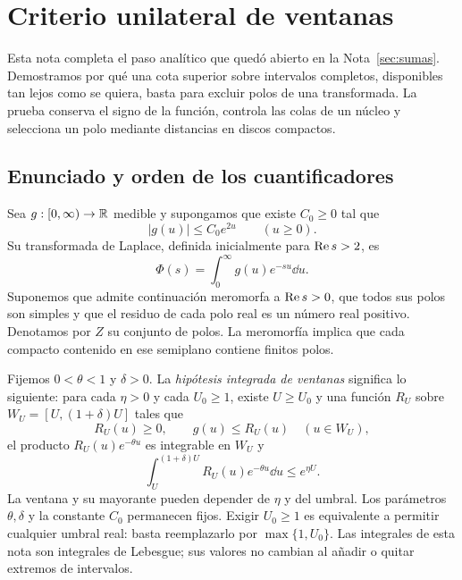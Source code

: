 \section{Criterio unilateral de ventanas}
\label{sec:ventanas}

Esta nota completa el paso analítico que quedó abierto en la
Nota~\ref{sec:sumas}. Demostramos por qué una cota superior sobre intervalos
completos, disponibles tan lejos como se quiera, basta para excluir polos
de una transformada. La prueba conserva el signo de la función, controla
las colas de un núcleo y selecciona un polo mediante distancias en discos
compactos.


\subsection{Enunciado y orden de los cuantificadores}

Sea $g:[0,\infty)\to\mathbb{R}$ medible y supongamos que existe $C_0\ge0$ tal que
\begin{equation}
 |g(u)|\le C_0e^{2u}\qquad(u\ge0).
 \label{vent-crecimiento}
\end{equation}
Su transformada de Laplace, definida inicialmente para $\operatorname{Re} s>2$, es
\[
 \Phi(s)=\int_0^\infty g(u)e^{-su}\dd u.
\]
Suponemos que admite continuación meromorfa a $\operatorname{Re} s>0$, que todos sus
polos son simples y que el residuo de cada polo real es un número real
positivo. Denotamos por $Z$ su conjunto de polos. La meromorfía implica
que cada compacto contenido en ese semiplano contiene finitos polos.

Fijemos $0<\theta<1$ y $\delta>0$. La \emph{hipótesis integrada de ventanas}
significa lo siguiente: para cada $\eta>0$ y cada $U_0\ge1$, existe
$U\ge U_0$ y una función $R_U$ sobre $W_U=[U,(1+\delta)U]$ tales que
\[
 R_U(u)\ge0,\qquad g(u)\le R_U(u)\quad(u\in W_U),
\]
el producto $R_U(u)e^{-\theta u}$ es integrable en $W_U$ y
\begin{equation}
 \int_U^{(1+\delta)U}R_U(u)e^{-\theta u}\dd u\le e^{\eta U}.
 \label{vent-hipotesis}
\end{equation}
La ventana y su mayorante pueden depender de $\eta$ y del umbral.
Los parámetros $\theta,\delta$ y la constante $C_0$ permanecen fijos.
Exigir $U_0\ge1$ es equivalente a permitir cualquier umbral real: basta
reemplazarlo por $\max\{1,U_0\}$. Las integrales de esta nota son integrales
de Lebesgue; sus valores no cambian al añadir o quitar extremos de intervalos.

